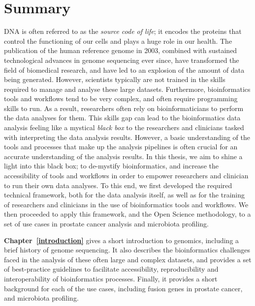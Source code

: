 \chapter{Summary}

DNA is often referred to as the \emph{source code of life}; it encodes the proteins that control the functioning of our cells and plays a huge role in our health. The publication of the human reference genome in 2003, combined with sustained technological advances in genome sequencing ever since, have transformed the field of biomedical research, and have led to an explosion of the amount of data being generated.
However, scientists typically are not trained in the skills required to manage and analyse these large datasets. Furthermore, bioinformatics tools and workflows tend to be very complex, and often require programming skills to run. As a result, researchers often rely on bioinformaticians to perform the data analyses for them.
This skills gap can lead to the bioinformatics data analysis feeling like a mystical \textit{black box} to the researchers and clinicians tasked with interpreting the data analysis results.
However, a basic understanding of the tools and processes that make up the analysis pipelines is often crucial for an accurate understanding of the analysis results. In this thesis, we aim to shine a light into this black box; to de-mystify bioinformatics, and increase the accessibility of tools and workflows in order to empower researchers and clinician to run their own data analyses.
To this end, we first developed the required technical framework, both for the data analysis itself, as well as for the training of researchers and clinicians in the use of bioinformatics tools and workflows. We then proceeded to apply this framework, and the Open Science methodology, to a set of use cases in prostate cancer analysis and microbiota profiling.

\textbf{Chapter~\ref{introduction}} gives a short introduction to genomics, including a brief history of genome sequencing. It also describes the bioinformatics challenges faced in the analysis of these often large and complex datasets, and provides a set of best-practice guidelines to facilitate accessibility, reproducibility and interoperability of bioinformatics processes. Finally, it provides a short background for each of the use cases, including fusion genes in prostate cancer, and microbiota profiling.

